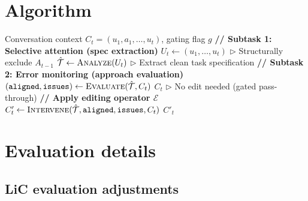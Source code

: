 \documentclass{article}
\begin{document}
\begin{ack}
\end{ack}






\appendix

\section{Algorithm}
\label{app:algorithm}

\begin{algorithm}[h]
\caption{Agentic Context Curation (ACC)}
\label{alg:context-edit}
\begin{algorithmic}[1]
\REQUIRE Conversation context $C_t = (u_1, a_1, \ldots, u_t)$, gating flag $g$
\STATE \textbf{// Subtask 1: Selective attention (spec extraction)}
\STATE $U_t \leftarrow (u_1, \ldots, u_t)$ \hfill $\triangleright$ Structurally exclude $A_{t-1}$
\STATE $\hat{\mathcal{T}} \leftarrow \textsc{Analyze}(U_t)$ \hfill $\triangleright$ Extract clean task specification
\STATE \textbf{// Subtask 2: Error monitoring (approach evaluation)}
\STATE $(\texttt{aligned}, \texttt{issues}) \leftarrow \textsc{Evaluate}(\hat{\mathcal{T}}, C_t)$
    \RETURN $C_t$ \hfill $\triangleright$ No edit needed (gated pass-through)
\ENDIF
\STATE \textbf{// Apply editing operator $\mathcal{E}$}
\STATE $C'_t \leftarrow \textsc{Intervene}(\hat{\mathcal{T}}, \texttt{aligned}, \texttt{issues}, C_t)$
\RETURN $C'_t$
\end{algorithmic}
\end{algorithm}


\section{Evaluation details}
\label{app:eval-details}

\subsection{LiC evaluation adjustments}
\label{app:user-sim-qc}
\end{document}

